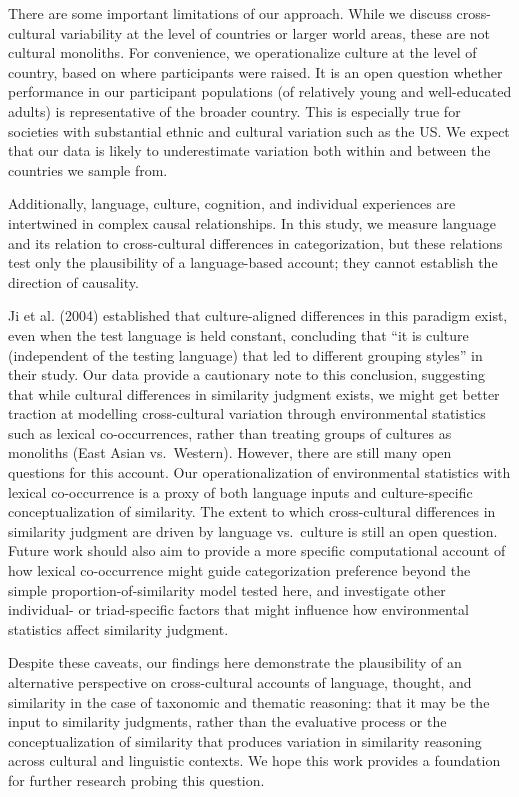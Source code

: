 \documentclass[10pt, letterpaper]{article}
\begin{document}
There are some important limitations of our approach. While we discuss
cross-cultural variability at the level of countries or larger world
areas, these are not cultural monoliths. For convenience, we
operationalize culture at the level of country, based on where
participants were raised. It is an open question whether performance in
our participant populations (of relatively young and well-educated
adults) is representative of the broader country. This is especially
true for societies with substantial ethnic and cultural variation such
as the US. We expect that our data is likely to underestimate variation
both within and between the countries we sample from.

Additionally, language, culture, cognition, and individual experiences
are intertwined in complex causal relationships. In this study, we
measure language and its relation to cross-cultural differences in
categorization, but these relations test only the plausibility of a
language-based account; they cannot establish the direction of
causality.

Ji et al. (2004) established that culture-aligned differences in this
paradigm exist, even when the test language is held constant, concluding
that ``it is culture (independent of the testing language) that led to
different grouping styles'' in their study. Our data provide a
cautionary note to this conclusion, suggesting that while cultural
differences in similarity judgment exists, we might get better traction
at modelling cross-cultural variation through environmental statistics
such as lexical co-occurrences, rather than treating groups of cultures
as monoliths (East Asian vs.~Western). However, there are still many
open questions for this account. Our operationalization of environmental
statistics with lexical co-occurrence is a proxy of both language inputs
and culture-specific conceptualization of similarity. The extent to
which cross-cultural differences in similarity judgment are driven by
language vs.~culture is still an open question. Future work should also
aim to provide a more specific computational account of how lexical
co-occurrence might guide categorization preference beyond the simple
proportion-of-similarity model tested here, and investigate other
individual- or triad-specific factors that might influence how
environmental statistics affect similarity judgment.

Despite these caveats, our findings here demonstrate the plausibility of
an alternative perspective on cross-cultural accounts of language,
thought, and similarity in the case of taxonomic and thematic reasoning:
that it may be the input to similarity judgments, rather than the
evaluative process or the conceptualization of similarity that produces
variation in similarity reasoning across cultural and linguistic
contexts. We hope this work provides a foundation for further research
probing this question.
\end{document}
